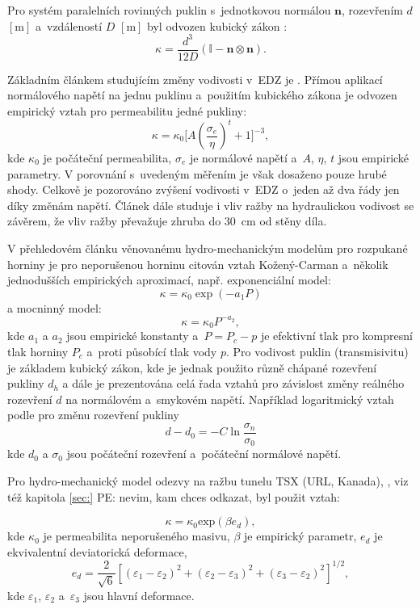 \documentclass{article}
\def\vc#1{\mathbf{\boldsymbol{#1}}}     %
\def\tn#1{{\mathbb{#1}}}    %
\newcommand{\pe}[1]{{\color{orange} PE: #1}}
\begin{document}
Pro systém paralelních rovinných puklin s~jednotkovou normálou $\vc n$, rozevřením $d$ $[\mathrm{m}]$ a~vzdáleností $D$ $[\mathrm{m}]$
byl odvozen kubický zákon \cite{Snow1969}:
\[
 \kappa = \frac{d^3}{12 D} (\tn I - \vc n \otimes \vc n).
\]

Základním článkem studujícím změny vodivosti v~EDZ je \cite{Kelsall1984}. Přímou aplikací normálového napětí
na jednu puklinu a~použitím kubického zákona je odvozen empirický vztah pro permeabilitu jedné pukliny:
\[
  \kappa = \kappa_0 \Big[A (\frac{\sigma_e}{\eta})^t+1\Big]^{-3},
\]
kde $\kappa_0$ je počáteční permeabilita, $\sigma_e$ je normálové napětí a~$A$, $\eta$, $t$ jsou empirické parametry.
V porovnání s~uvedeným měřením je však dosaženo pouze hrubé shody. Celkově je pozorováno zvýšení vodivosti v~EDZ o~jeden až dva řády jen díky změnám napětí.
Článek dále studuje i vliv ražby na hydraulickou vodivost se závěrem, že vliv ražby převažuje zhruba do 30~cm od stěny díla. 


V přehledovém článku \cite{Rutqvist2003} věnovanému hydro-mechanickým modelům pro rozpukané horniny
je pro neporušenou horninu citován vztah Kožený-Carman a~několik jednodušších empirických aproximací, např.
exponenciální model:
\[
  \kappa=\kappa_0 \exp(-a_1 P)
\]
a 
mocninný model:
\[
  \kappa=\kappa_0 P^{-a_2},
\]
kde $a_1$ a $a_2$ jsou empirické konstanty a~$P=P_c - p$ je efektivní tlak pro kompresní tlak horniny $P_c$ a~proti působící tlak vody $p$.
Pro vodivost puklin (transmisivitu) je základem kubický zákon, kde je jednak použito různě chápané  rozevření pukliny $d_h$ 
a dále je prezentována celá řada vztahů pro závislost změny reálného rozevření $d$ na normálovém a~smykovém napětí. Například logaritmický vztah 
podle \cite{Kohl1995} pro změnu rozevření pukliny
\[
   d - d_0 = - C \ln \frac{\sigma_n}{\sigma_0}
\]
kde $d_0$ a $\sigma_0$ jsou počáteční rozevření a~počáteční normálové napětí. 

Pro hydro-mechanický model odezvy na ražbu tunelu TSX (URL, Kanada), \cite{Rutqvist2009}, viz též kapitola \ref{sec:} \pe{nevim, kam chces odkazat}, byl použit vztah:

$$
	\kappa = \kappa_0 \mbox{exp}(\beta e_d),
$$
kde $\kappa_0$ je permeabilita neporušeného masivu, $\beta$ je empirický parametr, $e_d$ je ekvivalentní
deviatorická deformace,
$$
	e_d = \frac{2}{\sqrt{6}}[(\varepsilon_1 - \varepsilon_2)^2 + (\varepsilon_2 - \varepsilon_3)^2 + (\varepsilon_3 - \varepsilon_2)^2]^{1/2},
$$
kde $\varepsilon_1$, $\varepsilon_2$ a~$\varepsilon_3$ jsou hlavní deformace.
\end{document}
